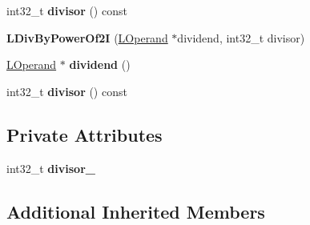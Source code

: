 \begin{DoxyCompactItemize}
\item 
int32\+\_\+t {\bfseries divisor} () const \hypertarget{classv8_1_1internal_1_1_l_div_by_power_of2_i_a1ecfe968b5695fb6ce2e409408bad665}{}\label{classv8_1_1internal_1_1_l_div_by_power_of2_i_a1ecfe968b5695fb6ce2e409408bad665}

\item 
{\bfseries L\+Div\+By\+Power\+Of2I} (\hyperlink{classv8_1_1internal_1_1_l_operand}{L\+Operand} $\ast$dividend, int32\+\_\+t divisor)\hypertarget{classv8_1_1internal_1_1_l_div_by_power_of2_i_aab2d9532de12649fb56d5fb221e67eaf}{}\label{classv8_1_1internal_1_1_l_div_by_power_of2_i_aab2d9532de12649fb56d5fb221e67eaf}

\item 
\hyperlink{classv8_1_1internal_1_1_l_operand}{L\+Operand} $\ast$ {\bfseries dividend} ()\hypertarget{classv8_1_1internal_1_1_l_div_by_power_of2_i_a13e848c75a58a333aa73e7a63d3135b0}{}\label{classv8_1_1internal_1_1_l_div_by_power_of2_i_a13e848c75a58a333aa73e7a63d3135b0}

\item 
int32\+\_\+t {\bfseries divisor} () const \hypertarget{classv8_1_1internal_1_1_l_div_by_power_of2_i_a1ecfe968b5695fb6ce2e409408bad665}{}\label{classv8_1_1internal_1_1_l_div_by_power_of2_i_a1ecfe968b5695fb6ce2e409408bad665}

\end{DoxyCompactItemize}
\subsection*{Private Attributes}
\begin{DoxyCompactItemize}
\item 
int32\+\_\+t {\bfseries divisor\+\_\+}\hypertarget{classv8_1_1internal_1_1_l_div_by_power_of2_i_ad1a0282a77e615a8f2fdafa8b92896cb}{}\label{classv8_1_1internal_1_1_l_div_by_power_of2_i_ad1a0282a77e615a8f2fdafa8b92896cb}

\end{DoxyCompactItemize}
\subsection*{Additional Inherited Members}


